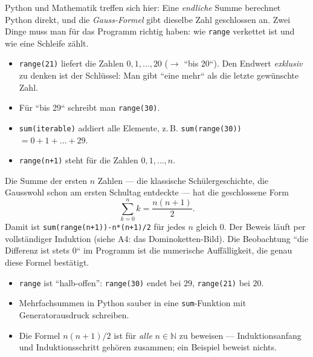 


Python und Mathematik treffen sich hier: Eine \emph{endliche} Summe
berechnet Python direkt, und die \emph{Gauss-Formel} gibt dieselbe Zahl
geschlossen an. Zwei Dinge muss man für das Programm richtig haben:
wie \texttt{range} verkettet ist und wie eine Schleife zählt.

\begin{werkzeugkasten}
\begin{itemize}
  \item \texttt{range(21)} liefert die Zahlen $0,1,\dots,20$
        ($\to$ ``bis 20``). Den Endwert \emph{exklusiv} zu denken ist der
        Schlüssel: Man gibt ``eine mehr`` als die letzte gewünschte Zahl.
  \item Für ``bis 29`` schreibt man \texttt{range(30)}.
  \item \texttt{sum(iterable)} addiert alle Elemente,
        z.\,B. \texttt{sum(range(30))} $=0+1+\dots+29$.
  \item \texttt{range(n+1)} steht für die Zahlen $0,1,\dots,n$.
\end{itemize}
\end{werkzeugkasten}

\begin{werkzeugkasten}
Die Summe der ersten $n$ Zahlen --- die klassische Schülergeschichte, die
Gausswohl schon am ersten Schultag entdeckte --- hat die geschlossene Form
\begin{equation}
  \sum_{k=0}^{n} k = \frac{n(n+1)}2 .
\end{equation}
Damit ist \texttt{sum(range(n+1))-n*(n+1)/2} für jedes $n$ gleich $0$.
Der Beweis läuft per vollständiger Induktion (siehe A4: das
Dominoketten-Bild). Die Beobachtung ``die Differenz ist stets $0$`` im
Programm ist die numerische Auff\"alligkeit, die genau diese Formel
bestätigt.
\end{werkzeugkasten}

\begin{achtung}
\begin{itemize}
  \item \texttt{range} ist ``halb-offen'': \texttt{range(30)} endet bei
        $29$, \texttt{range(21)} bei $20$.
  \item Mehrfachsummen in Python sauber in eine \texttt{sum}-Funktion mit
        Generatorausdruck schreiben.
  \item Die Formel $n(n+1)/2$ ist für \emph{alle} $n\in\mathbb N$ zu
        beweisen --- Induktionsanfang und Induktionsschritt gehören
        zusammen; ein Beispiel beweist nichts.
\end{itemize}
\end{achtung}
